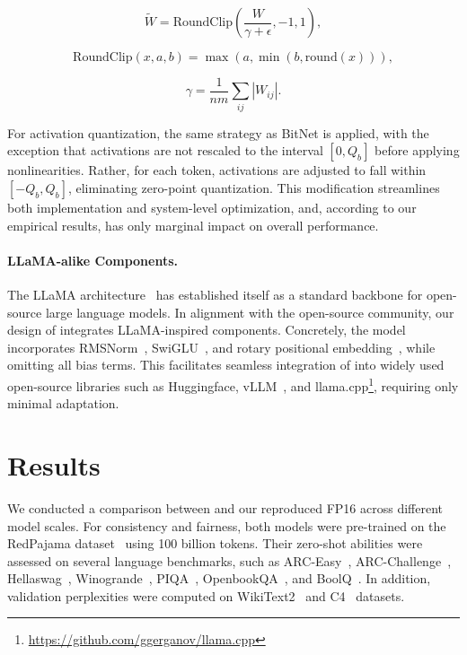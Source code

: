\begin{equation}
    \widetilde{W} = \mathrm{RoundClip}(\frac{W}{\gamma + \epsilon}, -1, 1),
\end{equation}

\begin{equation}
    \mathrm{RoundClip}(x, a, b) = \max(a, \min(b, \mathrm{round}(x))),
\end{equation}

\begin{equation}
    \gamma = \frac{1}{nm}\sum_{ij} |W_{ij}|.
\end{equation}

For activation quantization, the same strategy as BitNet is applied, with the exception that activations are not rescaled to the interval $[0, Q_b]$ before applying nonlinearities. Rather, for each token, activations are adjusted to fall within $[-Q_b, Q_b]$, eliminating zero-point quantization. This modification streamlines both implementation and system-level optimization, and, according to our empirical results, has only marginal impact on overall performance.

\paragraph{LLaMA-alike Components.}

The LLaMA architecture~\cite{llama, llama2} has established itself as a standard backbone for open-source large language models. In alignment with the open-source community, our design of  integrates LLaMA-inspired components. Concretely, the model incorporates RMSNorm~\cite{rmsnorm}, SwiGLU~\cite{swiglu}, and rotary positional embedding~\cite{rope}, while omitting all bias terms. This facilitates seamless integration of  into widely used open-source libraries such as Huggingface, vLLM~\cite{vllm}, and llama.cpp\footnote{\url{https://github.com/ggerganov/llama.cpp}}, requiring only minimal adaptation.

\section{Results}

We conducted a comparison between  and our reproduced FP16  across different model scales. For consistency and fairness, both models were pre-trained on the RedPajama dataset~\cite{redpajama} using 100 billion tokens. Their zero-shot abilities were assessed on several language benchmarks, such as ARC-Easy~\cite{arc}, ARC-Challenge~\cite{arc}, Hellaswag~\cite{hellaswag}, Winogrande~\cite{winoGrande}, PIQA~\cite{piqa}, OpenbookQA~\cite{openbookqa}, and BoolQ~\cite{boolq}. In addition, validation perplexities were computed on WikiText2~\cite{wikitext2} and C4~\cite{c4} datasets.

